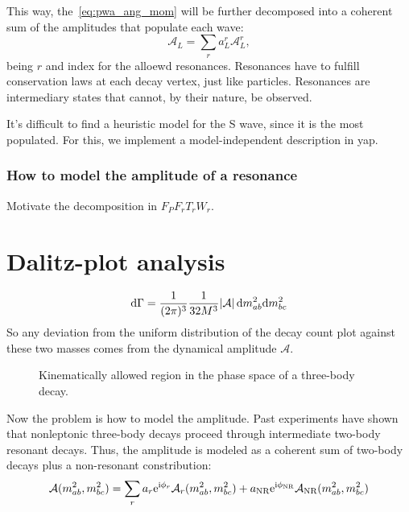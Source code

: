 \documentclass[
	fontsize=10pt,
	open=right,
	twoside,
    english,
    draft,
]{scrbook}
\newcommand{\A}{\ensuremath{\mathcal{A}}}
\begin{document}
        This way, the~\eqref{eq:pwa_ang_mom} will be further decomposed into a coherent sum of the amplitudes that populate each wave:
        \begin{equation}
            \A_L = \sum_r a_L^r \A_L^r,
        \end{equation}
        being $r$ and index for the alloewd resonances.
        Resonances have to fulfill conservation laws at each decay vertex, just like particles.
        Resonances are intermediary states that cannot, by their nature, be observed.



        It's difficult to find a heuristic model for the S wave, since it is the most populated.
        For this, we implement a model-independent description in \ac{yap}.

            \subsubsection{How to model the amplitude of a resonance}
            Motivate the decomposition in $F_P F_r T_r W_r$.

    \section{Dalitz-plot analysis}

    \begin{equation}
        \ud\Gamma = \frac{1}{(2\pi)^3}\frac{1}{32M^3}\abs{\A}\ud m_{ab}^2 \!\ud m_{bc}^2
    \end{equation}
    So any deviation from the uniform distribution of the decay count plot against these two masses comes from the dynamical amplitude \A{}.

    \begin{figure}
        \centering
        \caption{Kinematically allowed region in the phase space of a three-body decay.}
    \end{figure}


    Now the problem is how to model the amplitude.
    Past experiments have shown that nonleptonic three-body decays proceed through intermediate two-body resonant decays.
    Thus, the amplitude is modeled as a coherent sum of two-body decays plus a non-resonant constribution:
    \begin{equation}
        \A(m_{ab}^2, m_{bc}^2) = \sum_r a_r \eu^{\iu\phi_r}\A_r(m_{ab}^2,m_{bc}^2)
        + a_{\textup{NR}} \eu^{\iu \phi_{\textup{NR}}} \A_{\textup{NR}}(m_{ab}^2,m_{bc}^2)
    \end{equation}
\end{document}

